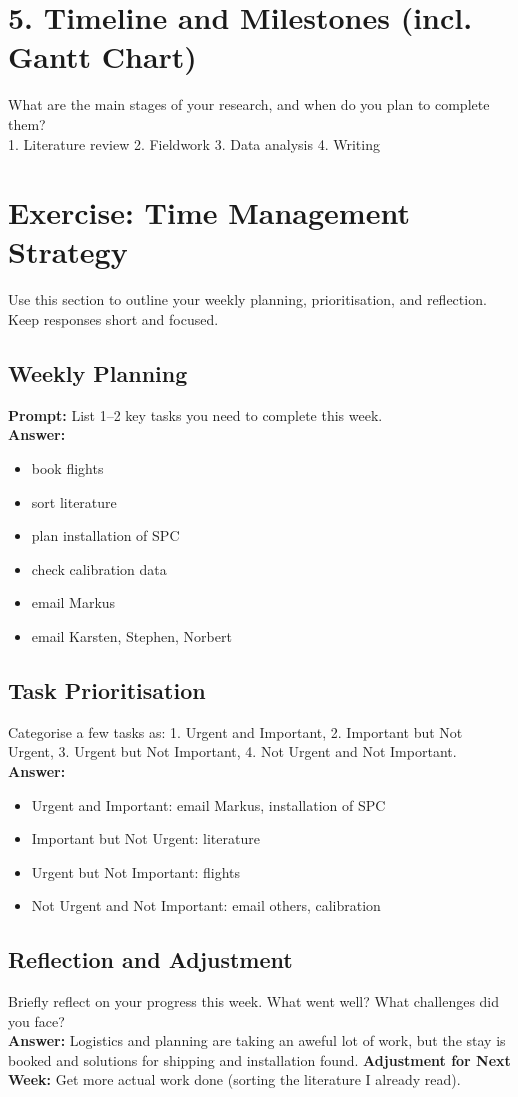 \documentclass[a4paper,12pt]{article}
\begin{document}
\section{5. Timeline and Milestones (incl. Gantt Chart)}
What are the main stages of your research, and when do you plan to complete them?\\
1. Literature review
2. Fieldwork
3. Data analysis
4. Writing

\section{Exercise: Time Management Strategy}
Use this section to outline your weekly planning, prioritisation, and reflection. Keep responses short and focused.

\subsection*{Weekly Planning}
\textbf{Prompt:} List 1–2 key tasks you need to complete this week.\\
\textbf{Answer:}
\begin{itemize}
    \item book flights
    \item sort literature
    \item plan installation of SPC
    \item check calibration data
    \item email Markus
    \item email Karsten, Stephen, Norbert
\end{itemize}

\subsection*{Task Prioritisation}
 Categorise a few tasks as: 1. Urgent and Important, 2. Important but Not Urgent, 3. Urgent but Not Important, 4. Not Urgent and Not Important.\\
\textbf{Answer:}
\begin{itemize}
    \item Urgent and Important: email Markus, installation of SPC
    \item Important but Not Urgent: literature
    \item Urgent but Not Important: flights
    \item Not Urgent and Not Important: email others, calibration
\end{itemize}

\subsection*{Reflection and Adjustment}
Briefly reflect on your progress this week. What went well? What challenges did you face?\\
\textbf{Answer:} 
Logistics and planning are taking an aweful lot of work, but the stay is booked and solutions for shipping and installation found.
\noindent
\textbf{Adjustment for Next Week:} 
Get more actual work done (sorting the literature I already read).
\end{document}
